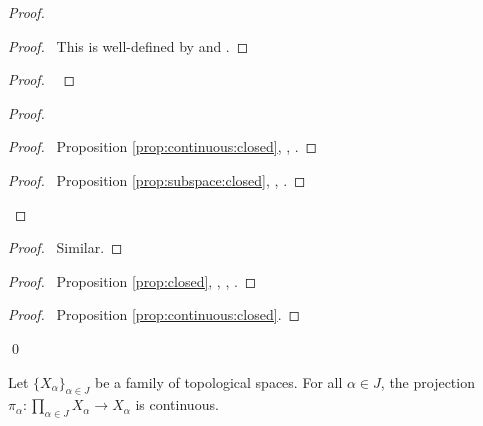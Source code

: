 \begin{proof}
  \pf
  \begin{proof}
    \pf\ This is well-defined by  and .
  \end{proof}
  \begin{proof}
    \pf\ 
  \end{proof}
  \begin{proof}
    \begin{proof}
      \pf\ Proposition \ref{prop:continuous:closed}, , .
    \end{proof}
    \qedstep
    \begin{proof}
      \pf\ Proposition \ref{prop:subspace:closed}, , .
    \end{proof}
  \end{proof}
  \begin{proof}
    \pf\ Similar.
  \end{proof}
  \begin{proof}
    \pf\ Proposition \ref{prop:closed}, , , .
  \end{proof}
  \qedstep
  \begin{proof}
    \pf\ Proposition \ref{prop:continuous:closed}.
  \end{proof}
  \qed
\end{proof}

\begin{prop}
  \label{prop:continuous:projection}
  Let $\{ X_\alpha \}_{\alpha \in J}$ be a family of topological spaces. For all $\alpha \in J$, the projection $\pi_\alpha : \prod_{\alpha \in J} X_\alpha \rightarrow X_\alpha$ is continuous.
\end{prop}

